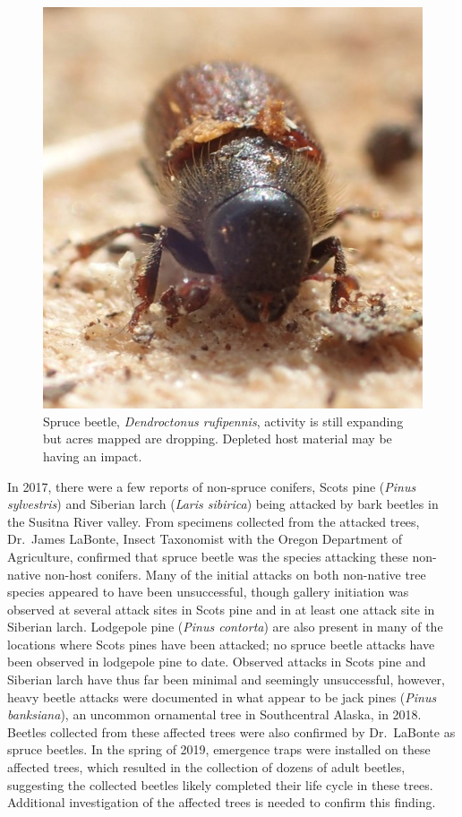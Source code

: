 \begin{figure}[H]
\begin{center}
\vspace{2mm}
\includegraphics[width=\textwidth]{img/spruce_beetle.jpg}
\caption{Spruce beetle, \textit{Dendroctonus rufipennis}, activity is still expanding but acres mapped are dropping. Depleted host material may be having an impact.}
\label{spruce_beetle}
\end{center}
\end{figure} 

In 2017, there were a few reports of non-spruce conifers, Scots pine (\textit{Pinus sylvestris}) and Siberian larch (\textit{Laris sibirica}) being attacked by bark beetles in the Susitna River valley. From specimens collected from the attacked trees, Dr.\ James LaBonte, Insect Taxonomist with the Oregon Department of Agriculture, confirmed that spruce beetle was the species attacking these non-native non-host conifers. Many of the initial attacks on both non-native tree species appeared to have been unsuccessful, though gallery initiation was observed at several attack sites in Scots pine and in at least one attack site in Siberian larch. Lodgepole pine (\textit{Pinus contorta}) are also present in many of the locations where Scots pines have been attacked; no spruce beetle attacks have been observed in lodgepole pine to date. Observed attacks in Scots pine and Siberian larch have thus far been minimal and seemingly unsuccessful, however, heavy beetle attacks were documented in what appear to be jack pines (\textit{Pinus banksiana}), an uncommon ornamental tree in Southcentral Alaska, in 2018. Beetles collected from these affected trees were also confirmed by Dr.\ LaBonte as spruce beetles. In the spring of 2019, emergence traps were installed on these affected trees, which resulted in the collection of dozens of adult beetles, suggesting the collected beetles likely completed their life cycle in these trees. Additional investigation of the affected trees is needed to confirm this finding. 

